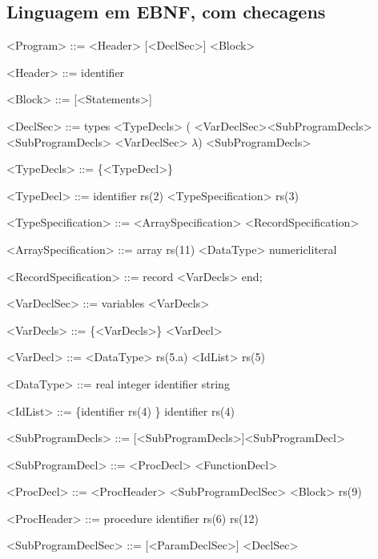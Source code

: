 \documentclass[a4paper,12pt]{article}
\begin{document}
    \subsection{Linguagem em EBNF, com checagens}
\begin{rules}
    \begin{numberedgrammar}

      <Program> ::= <Header> [<DeclSec>] <Block> 

      <Header> ::=   identifier \lit{;}

      <Block> ::=  [<Statements>] 

      <DeclSec> ::=  types <TypeDecls> ( <VarDeclSec><SubProgramDecls>
      \alt<SubProgramDecls>
      \alt <VarDeclSec> 
      \alt $\lambda$)
      \alt [<VarDeclSec>] <SubProgramDecls> 

      <TypeDecls> ::= \{<TypeDecl>\}

      <TypeDecl> ::= identifier rs(2) <TypeSpecification> rs(3)

      <TypeSpecification> ::= <ArraySpecification>
      \alt <RecordSpecification>

      <ArraySpecification> ::= array rs(11) <DataType> \lit{[}numericliteral\lit{]} \lit{;} 

      <RecordSpecification> ::= record <VarDecls> end;

      <VarDeclSec> ::= variables <VarDecls>

      <VarDecls> ::= \{<VarDecls>\} <VarDecl>

      <VarDecl> ::= <DataType> rs(5.a) <IdList> rs(5)\lit{;}

      <DataType> ::= real
      \alt integer
      \alt identifier
      \alt string 

      <IdList> ::=  \{identifier rs(4) \lit{,}\} identifier rs(4)

      <SubProgramDecls> ::= [<SubProgramDecls>]<SubProgramDecl>

      <SubProgramDecl> ::= <ProcDecl>
      \alt <FunctionDecl>

      <ProcDecl> ::= <ProcHeader> <SubProgramDeclSec> <Block> rs(9)\lit{;}

      <ProcHeader> ::= procedure identifier rs(6) rs(12)\lit{;}

      <SubProgramDeclSec> ::= [<ParamDeclSec>] <DeclSec> 
    \end{numberedgrammar}    
    \end{rules}
    
\end{document}
